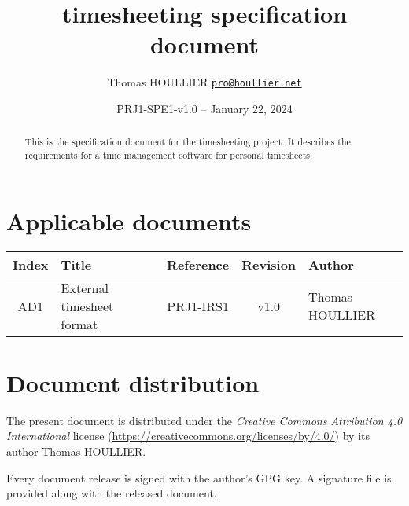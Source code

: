\documentclass[letterpaper]{article}
\title{timesheeting specification document}
\author{Thomas HOULLIER \href{mailto:pro@houllier.net}
         {\texttt{\textlangle pro@houllier.net\textrangle}}}
\begin{document}
\frenchspacing
\date{PRJ1-SPE1-v1.0 -- January 22, 2024}
\maketitle
\thispagestyle{FirstPage}

\begin{abstract}
  This is the specification document for the timesheeting project.
  It describes the requirements for a time management software for
  personal timesheets.
\end{abstract}

\begin{versionhistory}
\end{versionhistory}
\setcounter{table}{0} %

\section*{Applicable documents}
{ \centering
\begin{tabularx}{\textwidth}{| c | X | c | c | X |} \hline
  Index & Title & Reference & Revision & Author \\ \hline
  AD1   & External timesheet format & PRJ1-IRS1 & v1.0 & Thomas HOULLIER \\
  \hline \end{tabularx} \par }

\section*{Document distribution}
The present document is distributed under the \emph{Creative Commons Attribution
4.0 International} license (\url{https://creativecommons.org/licenses/by/4.0/})
by its author Thomas HOULLIER.

Every document release is signed with the author's GPG key. A signature file
is provided along with the released document.

\tableofcontents
\printglossary[type=\acronymtype,style=index]
\pagestyle{plain}




\appendix


\apptocmd{\thebibliography}{\raggedright}{}{}
\begingroup
{}
\setlength\bibitemsep{0pt}
\printbibliography
\endgroup
\end{document}
